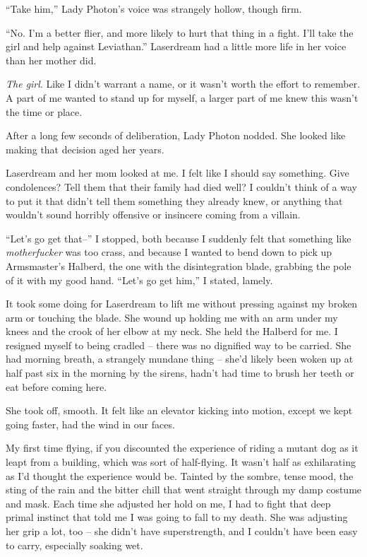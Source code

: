 ``Take him,'' Lady Photon's voice was strangely hollow, though firm.



``No.  I'm a better flier, and more likely to hurt that thing in a fight.  I'll take the girl and help against Leviathan.''  Laserdream had a little more life in her voice than her mother did.



\emph{The girl}.  Like I didn't warrant a name, or it wasn't worth the effort to remember.  A part of me wanted to stand up for myself, a larger part of me knew this wasn't the time or place.



After a long few seconds of deliberation, Lady Photon nodded.  She looked like making that decision aged her years.



Laserdream and her mom looked at me.  I felt like I should say something.  Give condolences?  Tell them that their family had died well?  I couldn't think of a way to put it that didn't tell them something they already knew, or anything that wouldn't sound horribly offensive or insincere coming from a villain.



``Let's go get that--'' I stopped, both because I suddenly felt that something like \emph{motherfucker} was too crass, and because I wanted to bend down to pick up Armsmaster's Halberd, the one with the disintegration blade, grabbing the pole of it with my good hand. ``Let's go get him,'' I stated, lamely.



It took some doing for Laserdream to lift me without pressing against my broken arm or touching the blade. She wound up holding me with an arm under my knees and the crook of her elbow at my neck.  She held the Halberd for me.  I resigned myself to being cradled – there was no dignified way to be carried.  She had morning breath, a strangely mundane thing – she'd likely been woken up at half past six in the morning by the sirens, hadn't had time to brush her teeth or eat before coming here.



She took off, smooth.  It felt like an elevator kicking into motion, except we kept going faster, had the wind in our faces.



My first time flying, if you discounted the experience of riding a mutant dog as it leapt from a building, which was sort of half-flying.  It wasn't half as exhilarating as I'd thought the experience would be.  Tainted by the sombre, tense mood, the sting of the rain and the bitter chill that went straight through my damp costume and mask.  Each time she adjusted her hold on me, I had to fight that deep primal instinct that told me I was going to fall to my death.  She was adjusting her grip a lot, too – she didn't have superstrength, and I couldn't have been easy to carry, especially soaking wet.



